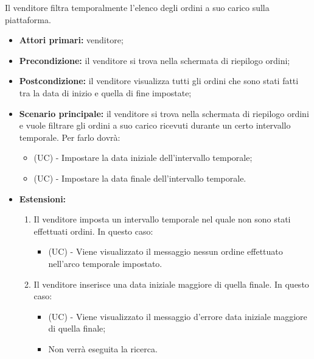 Il venditore filtra temporalmente l'elenco degli ordini a suo carico sulla piattaforma.
\begin{itemize}
	\item \textbf{Attori primari:} venditore;
	\item \textbf{Precondizione:} il venditore si trova nella schermata di riepilogo ordini;
	\item \textbf{Postcondizione:} il venditore visualizza tutti gli ordini che sono stati fatti tra la data di inizio e quella di fine impostate;
	\item \textbf{Scenario principale:} il venditore si trova nella schermata di riepilogo ordini e vuole filtrare gli ordini a suo carico ricevuti durante un certo intervallo temporale. Per farlo dovrà:
	\begin{itemize}
		\item (UC) - Impostare la data iniziale dell'intervallo temporale;
		\item (UC) - Impostare la data finale dell'intervallo temporale.
	\end{itemize}
	\item \textbf{Estensioni:}
	\begin{enumerate}[label=\lett]
		\item Il venditore imposta un intervallo temporale nel quale non sono stati effettuati ordini. In questo caso:
		\begin{itemize}
			\item (UC) - Viene visualizzato il messaggio nessun ordine effettuato nell'arco temporale impostato.
		\end{itemize}
		\item Il venditore inserisce una data iniziale maggiore di quella finale. In questo caso:
		\begin{itemize}
			\item (UC) - Viene visualizzato il messaggio d'errore data iniziale maggiore di quella finale;
			\item Non verrà eseguita la ricerca.
		\end{itemize}
	\end{enumerate}
\end{itemize}

